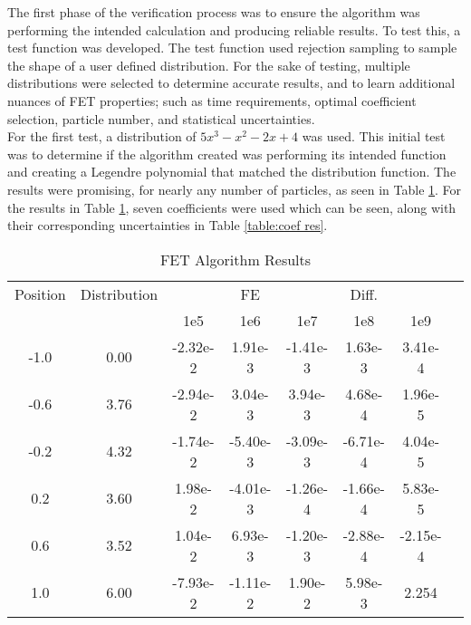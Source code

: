 \documentclass[10tma4paper]{article}
\begin{document}
The first phase of the verification process was to ensure the algorithm was performing the intended calculation and producing reliable results. To test this, a test function was developed. The test function used rejection sampling to sample the shape of a user defined distribution. For the sake of testing, multiple distributions were selected to determine accurate results, and to learn additional nuances of FET properties; such as time requirements, optimal coefficient selection, particle number, and statistical uncertainties.
\\
For the first test, a distribution of $5x^{3}-x^{2}-2x+4$ was used. This initial test was to determine if the algorithm created was performing its intended function and creating a Legendre polynomial that matched the distribution function. The results were promising, for nearly any number of particles, as seen in Table \ref{table:alg res}. For the results in Table \ref{table:alg res}, seven coefficients were used which can be seen, along with their corresponding uncertainties in Table \ref{table:coef res}.
\begin{table}[htbp!]
	\caption{FET Algorithm Results}
	\centering
	\begin{tabular}{c c c c c c c c}
		\hline
		Position & Distribution &  & FE &  & Diff. &  &\\[0.5ex]
		 & & 1e5 & 1e6 & 1e7 & 1e8 & 1e9 &\\
		 \hline
		 \hline
		-1.0 & 0.00 & -2.32e-2 & 1.91e-3  & -1.41e-3 & 1.63e-3  & 3.41e-4  & \\
		-0.6 & 3.76 & -2.94e-2 & 3.04e-3  & 3.94e-3  & 4.68e-4  & 1.96e-5  & \\
		-0.2 & 4.32 & -1.74e-2 & -5.40e-3 & -3.09e-3 & -6.71e-4 & 4.04e-5  & \\
		 0.2 & 3.60 & 1.98e-2  & -4.01e-3 & -1.26e-4 & -1.66e-4 & 5.83e-5  & \\
		 0.6 & 3.52 & 1.04e-2  & 6.93e-3  & -1.20e-3 & -2.88e-4 & -2.15e-4 & \\
		 1.0 & 6.00 & -7.93e-2 & -1.11e-2 & 1.90e-2  & 5.98e-3  & 2.254    & \\ [1ex]
		\hline
	\end{tabular}
	\label{table:alg res}
\end{table}
\end{document}
